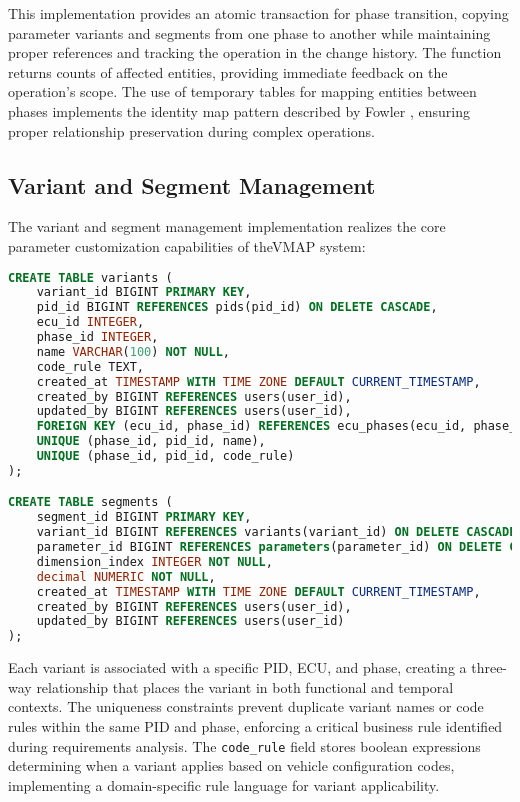 This implementation provides an atomic transaction for phase transition, copying parameter variants and segments from one phase to another while maintaining proper references and tracking the operation in the change history. The function returns counts of affected entities, providing immediate feedback on the operation's scope. The use of temporary tables for mapping entities between phases implements the identity map pattern described by Fowler \cite{fowler2003patterns}, ensuring proper relationship preservation during complex operations.

\subsection{Variant and Segment Management}
\label{subsec:variant-segment-management}

The variant and segment management implementation realizes the core parameter customization capabilities of the\ac{VMAP} system:

\begin{lstlisting}[language=SQL, caption={Variant and Segment Implementation}, label={lst:variant-segment-tables}]
CREATE TABLE variants (
    variant_id BIGINT PRIMARY KEY,
    pid_id BIGINT REFERENCES pids(pid_id) ON DELETE CASCADE,
    ecu_id INTEGER,
    phase_id INTEGER,
    name VARCHAR(100) NOT NULL,
    code_rule TEXT,
    created_at TIMESTAMP WITH TIME ZONE DEFAULT CURRENT_TIMESTAMP,
    created_by BIGINT REFERENCES users(user_id),
    updated_by BIGINT REFERENCES users(user_id),
    FOREIGN KEY (ecu_id, phase_id) REFERENCES ecu_phases(ecu_id, phase_id),
    UNIQUE (phase_id, pid_id, name),
    UNIQUE (phase_id, pid_id, code_rule)
);

CREATE TABLE segments (
    segment_id BIGINT PRIMARY KEY,
    variant_id BIGINT REFERENCES variants(variant_id) ON DELETE CASCADE,
    parameter_id BIGINT REFERENCES parameters(parameter_id) ON DELETE CASCADE,
    dimension_index INTEGER NOT NULL,
    decimal NUMERIC NOT NULL,
    created_at TIMESTAMP WITH TIME ZONE DEFAULT CURRENT_TIMESTAMP,
    created_by BIGINT REFERENCES users(user_id),
    updated_by BIGINT REFERENCES users(user_id)
);
\end{lstlisting}

Each variant is associated with a specific PID, ECU, and phase, creating a three-way relationship that places the variant in both functional and temporal contexts. The uniqueness constraints prevent duplicate variant names or code rules within the same PID and phase, enforcing a critical business rule identified during requirements analysis. The \texttt{code\_rule} field stores boolean expressions determining when a variant applies based on vehicle configuration codes, implementing a domain-specific rule language for variant applicability.

